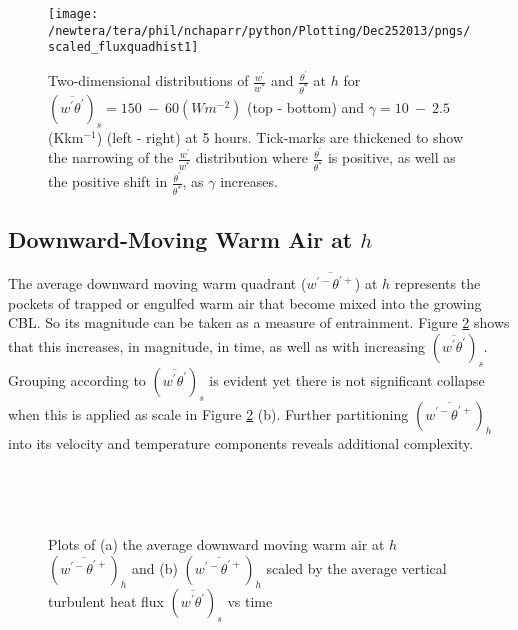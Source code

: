 \begin{figure}[htbp]
\centering
 \texttt{[image: /newtera/tera/phil/nchaparr/python/Plotting/Dec252013/pngs/scaled\_fluxquadhist1]}                 
\caption[Two-dimensional Distributions of $\frac{w^{'}}{w^{*}}$ and $\frac{\theta^{'}}{\theta^{*}}$ for all Runs]{Two-dimensional distributions of $\frac{w^{'}}{w^{*}}$ and $\frac{\theta^{'}}{\theta^{*}}$ at $h$ for $(\overline{w^{'}\theta^{'}})_{s} = 150 \ - \ 60 (Wm^{-2})$ (top - bottom) and $\gamma = 10 \ - \  2.5$(Kkm$^{-1}$) (left - right) at 5 hours. Tick-marks are thickened to show the narrowing of the $\frac{w^{'}}{w^{*}}$ distribution where $\frac{\theta^{'}}{\theta^{*}}$ is positive, as well as the positive shift in $\frac{\theta^{'}}{\theta^{*}}$, as $\gamma$ increases.}
\label{fig:scaled_fluxquadhs}
\end{figure}


\clearpage

\subsection{Downward-Moving Warm Air at $h$}
\label{subsec:downwarm}

The average downward moving warm quadrant ($\overline{w^{'-}\theta^{'+}}$) at $h$ represents the pockets of trapped or engulfed warm air that become mixed into the growing \acs{CBL}.  So its magnitude can be taken as a measure of entrainment.  Figure \ref{fig:downwarm} shows that this increases, in magnitude, in time, as well as with increasing $(\overline{w^{'}\theta^{'}})_{s}$.  Grouping according to $(\overline{w^{'}\theta^{'}})_{s}$ is evident yet there is not significant collapse when this is applied as scale in Figure \ref{fig:downwarm} (b).  Further partitioning $(\overline{w^{'-}\theta^{'+}})_{h}$ into its velocity and temperature components reveals additional complexity.\\

\begin{figure}[htbp]
\begin{minipage}[b]{0.5\linewidth}
        \\
        \end{minipage}             
\quad
\begin{minipage}[b]{0.5\linewidth}
        \\
     
       \end{minipage}
        \caption[Downward-moving warm Air at $h$]{Plots of (a) the average downward moving warm air at $h$ $(\overline{w^{\prime-}\theta^{\prime+}})_{h}$ and (b) $(\overline{w^{\prime-}\theta^{\prime+}})_{h}$ scaled by the average vertical turbulent heat flux $ ( \overline{ w^{'} \theta^{'} } )_{s} $ vs time}
        \label{fig:downwarm}
\end{figure}

